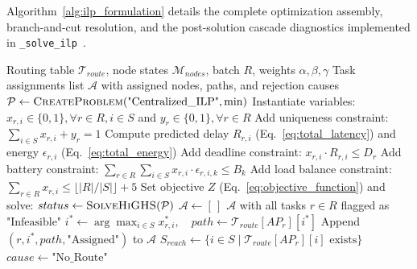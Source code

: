 Algorithm~\ref{alg:ilp_formulation} details the complete optimization assembly, branch-and-cut resolution, and the post-solution cascade diagnostics implemented in \texttt{\_solve\_ilp}~\cite{bagini_repo_2026}.

\begin{algorithm}[htbp]
\caption{ILP Problem Assembly, Resolution, and Cascade Diagnostics}
\label{alg:ilp_formulation}
\small
\begin{algorithmic}[1]
\Require Routing table $\mathcal{T}_{route}$, node states $\mathcal{M}_{nodes}$, batch $R$, weights $\alpha, \beta, \gamma$
\Ensure Task assignments list $\mathcal{A}$ with assigned nodes, paths, and rejection causes
\State $\mathcal{P} \gets \Call{CreateProblem}{\text{"Centralized\_ILP"}, \min}$
\State Instantiate variables: $x_{r,i} \in \{0, 1\}, \forall r \in R, i \in S$ and $y_r \in \{0, 1\}, \forall r \in R$
\Statex {}
    \State Add uniqueness constraint: $\sum_{i \in S} x_{r,i} + y_r = 1$ 
        \State Compute predicted delay $R_{r,i}$ (Eq.~\eqref{eq:total_latency}) and energy $\epsilon_{r,i}$ (Eq.~\eqref{eq:total_energy})
        \State Add deadline constraint: $x_{r,i} \cdot R_{r,i} \le D_r$ 
    \EndFor
\EndFor
{}
    \State Add battery constraint: $\sum_{r \in R} \sum_{i \in S} x_{r,i} \cdot \epsilon_{r,i,k} \le B_k$ 
    \State Add load balance constraint: $\sum_{r \in R} x_{r,i} \le \lfloor |R| / |S| \rfloor + 5$ 
\EndFor
\Statex {}
\State Set objective $Z$ (Eq.~\eqref{eq:objective_function}) and solve: $status \gets \Call{SolveHiGHS}{\mathcal{P}}$
\State $\mathcal{A} \gets [\,]$
    \State \Return $\mathcal{A}$ with all tasks $r \in R$ flagged as $\text{"Infeasible"}$
\EndIf
\Statex {}
     
        \State $i^* \gets \arg\max_{i \in S} x_{r,i}^*, \quad path \gets \mathcal{T}_{route}[AP_r][i^*]$
        \State Append $(r, i^*, path, \text{"Assigned"})$ to $\mathcal{A}$
    \Else {}
        \State $S_{reach} \gets \{i \in S \mid \mathcal{T}_{route}[AP_r][i] \text{ exists}\}$
        \State $cause \gets \text{"No\_Route"}$

\end{algorithmic}
\end{algorithm}
